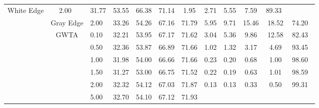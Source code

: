 \begin{table}[htbp]
{\begin{tabular}{cc|c|ccccccccc}
  White Edge &
  2.00\ &
  \multicolumn{1}{c|}{31.77} &
  \multicolumn{1}{c|}{53.55} &
  \multicolumn{1}{c|}{66.38} &
  \multicolumn{1}{c|}{71.14} &
  \multicolumn{1}{c|}{1.95} &
  \multicolumn{1}{c|}{2.71} &
  \multicolumn{1}{c|}{5.55} &
  \multicolumn{1}{c|}{7.59} &
  89.33\ \\ \cline{2-12} 
\multicolumn{1}{c|}{} &
  Gray Edge &
  2.00\ &
  \multicolumn{1}{c|}{33.26} &
  \multicolumn{1}{c|}{54.26} &
  \multicolumn{1}{c|}{67.16} &
  \multicolumn{1}{c|}{71.79} &
  \multicolumn{1}{c|}{5.95} &
  \multicolumn{1}{c|}{9.71} &
  \multicolumn{1}{c|}{15.46} &
  \multicolumn{1}{c|}{18.52} &
  74.20\ \\ \cline{2-12} 
\multicolumn{1}{c|}{} &
  \multirow{9}{*}{GWTA}&
  0.10\ &
  \multicolumn{1}{c|}{32.21} &
  \multicolumn{1}{c|}{53.95} &
  \multicolumn{1}{c|}{67.17} &
  \multicolumn{1}{c|}{71.62} &
  \multicolumn{1}{c|}{3.04} &
  \multicolumn{1}{c|}{5.36} &
  \multicolumn{1}{c|}{9.86} &
  \multicolumn{1}{c|}{12.58} &
  82.43\ \\ \cline{3-12} 
\multicolumn{1}{c|}{} &
   &
  0.50\ &
  \multicolumn{1}{c|}{32.36} &
  \multicolumn{1}{c|}{53.87} &
  \multicolumn{1}{c|}{66.89} &
  \multicolumn{1}{c|}{71.66} &
  \multicolumn{1}{c|}{1.02} &
  \multicolumn{1}{c|}{1.32} &
  \multicolumn{1}{c|}{3.17} &
  \multicolumn{1}{c|}{4.69} &
  93.45\ \\ \cline{3-12} 
\multicolumn{1}{c|}{} &
   &
  1.00\ &
  \multicolumn{1}{c|}{31.98} &
  \multicolumn{1}{c|}{54.00} &
  \multicolumn{1}{c|}{66.66} &
  \multicolumn{1}{c|}{71.66} &
  \multicolumn{1}{c|}{0.23} &
  \multicolumn{1}{c|}{0.20} &
  \multicolumn{1}{c|}{0.68} &
  \multicolumn{1}{c|}{1.00} &
  98.60\ \\ \cline{3-12} 
\multicolumn{1}{c|}{} &
   &
  1.50\ &
  \multicolumn{1}{c|}{31.27} &
  \multicolumn{1}{c|}{53.00} &
  \multicolumn{1}{c|}{66.75} &
  \multicolumn{1}{c|}{71.52} &
  \multicolumn{1}{c|}{0.22} &
  \multicolumn{1}{c|}{0.19} &
  \multicolumn{1}{c|}{0.63} &
  \multicolumn{1}{c|}{1.01} &
  98.59\ \\ \cline{3-12} 
\multicolumn{1}{c|}{} &
   &
  2.00\ &
  \multicolumn{1}{c|}{32.32} &
  \multicolumn{1}{c|}{54.12} &
  \multicolumn{1}{c|}{67.03} &
  \multicolumn{1}{c|}{71.87} &
  \multicolumn{1}{c|}{0.13} &
  \multicolumn{1}{c|}{0.13} &
  \multicolumn{1}{c|}{0.33} &
  \multicolumn{1}{c|}{0.50} &
  99.31\ \\ \cline{3-12} 
\multicolumn{1}{c|}{} &
   &
  5.00\ &
  \multicolumn{1}{c|}{32.70} &
  \multicolumn{1}{c|}{54.10} &
  \multicolumn{1}{c|}{67.12} &
  \multicolumn{1}{c|}{71.93} &

\end{tabular}}
\end{table}
